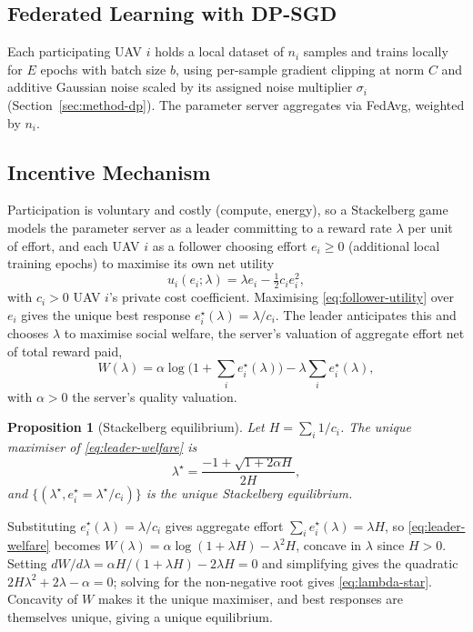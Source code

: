\documentclass[journal]{IEEEtran}
\newtheorem{proposition}{Proposition}
\begin{document}
\subsection{Federated Learning with DP-SGD}
Each participating UAV $i$ holds a local dataset of $n_i$ samples and
trains locally for $E$ epochs with batch size $b$, using per-sample
gradient clipping at norm $C$ and additive Gaussian noise scaled by its
assigned noise multiplier $\sigma_i$ (Section~\ref{sec:method-dp}). The
parameter server aggregates via FedAvg, weighted by $n_i$.

\subsection{Incentive Mechanism}
Participation is voluntary and costly (compute, energy), so a
Stackelberg game models the parameter server as a leader committing to
a reward rate $\lambda$ per unit of effort, and each UAV $i$ as a
follower choosing effort $e_i\ge0$ (additional local training epochs)
to maximise its own net utility
\begin{equation}
u_i(e_i;\lambda) = \lambda e_i - \tfrac{1}{2}c_i e_i^2,
\label{eq:follower-utility}
\end{equation}
with $c_i>0$ UAV $i$'s private cost coefficient. Maximising
\eqref{eq:follower-utility} over $e_i$ gives the unique best response
$e_i^\star(\lambda) = \lambda/c_i$. The leader anticipates this and
chooses $\lambda$ to maximise social welfare, the server's valuation of
aggregate effort net of total reward paid,
\begin{equation}
W(\lambda) = \alpha\log\Big(1+\sum_i e_i^\star(\lambda)\Big) - \lambda\sum_i e_i^\star(\lambda),
\label{eq:leader-welfare}
\end{equation}
with $\alpha>0$ the server's quality valuation.

\begin{proposition}[Stackelberg equilibrium]
\label{prop:stackelberg}
Let $H=\sum_i 1/c_i$. The unique maximiser of \eqref{eq:leader-welfare}
is
\begin{equation}
\lambda^\star = \frac{-1+\sqrt{1+2\alpha H}}{2H},
\label{eq:lambda-star}
\end{equation}
and $\{(\lambda^\star, e_i^\star=\lambda^\star/c_i)\}$ is the unique
Stackelberg equilibrium.
\end{proposition}
\begin{IEEEproof}
Substituting $e_i^\star(\lambda)=\lambda/c_i$ gives aggregate effort
$\sum_i e_i^\star(\lambda) = \lambda H$, so \eqref{eq:leader-welfare}
becomes $W(\lambda)=\alpha\log(1+\lambda H) - \lambda^2 H$, concave in
$\lambda$ since $H>0$. Setting $dW/d\lambda = \alpha H/(1+\lambda H) -
2\lambda H = 0$ and simplifying gives the quadratic
$2H\lambda^2+2\lambda-\alpha=0$; solving for the non-negative root
gives \eqref{eq:lambda-star}. Concavity of $W$ makes it the unique
maximiser, and best responses are themselves unique, giving a unique
equilibrium.
\end{IEEEproof}
\end{document}
